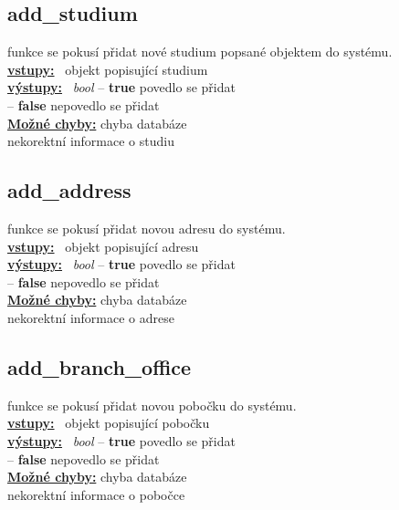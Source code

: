 \documentclass[a4paper, 11pt, twocolumn]{article}
\begin{document}
\subsection{add\_studium}\label{addux5fstudium}
\vspace*{-0.3cm}
funkce se pokusí přidat nové studium popsané objektem do systému. \\
\noindent \underline{\textbf{vstupy:}} \, objekt popisující studium  \\
\noindent \underline{\textbf{výstupy:}} \, \textit{bool} -- \textbf{true} povedlo se přidat \\
\hspace*{2.35cm} -- \textbf{false} nepovedlo se přidat  \\
\underline{\textbf{Možné chyby:}} chyba databáze \\
\hspace*{1.4cm} nekorektní informace o studiu

\subsection{add\_address}\label{addux5faddress}
\vspace*{-0.3cm}
funkce se pokusí přidat novou adresu do systému. \\
\noindent \underline{\textbf{vstupy:}} \, objekt popisující adresu  \\
\noindent \underline{\textbf{výstupy:}} \, \textit{bool} -- \textbf{true} povedlo se přidat \\
\hspace*{2.35cm} -- \textbf{false} nepovedlo se přidat  \\
\underline{\textbf{Možné chyby:}} chyba databáze \\
\hspace*{1.4cm} nekorektní informace o adrese

\subsection{add\_branch\_office}\label{addux5fbranchux5foffice}
\vspace*{-0.3cm}
funkce se pokusí přidat novou pobočku do systému. \\
\noindent \underline{\textbf{vstupy:}} \, objekt popisující pobočku  \\
\noindent \underline{\textbf{výstupy:}} \, \textit{bool} -- \textbf{true} povedlo se přidat \\
\hspace*{2.35cm} -- \textbf{false} nepovedlo se přidat  \\
\underline{\textbf{Možné chyby:}} chyba databáze \\
\hspace*{1.4cm} nekorektní informace o pobočce
\end{document}

